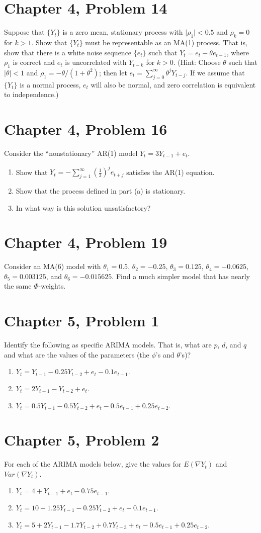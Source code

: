 \documentclass[11pt]{article}
\newif\ifclearpage
\newcommand{\problem}[1]{\section*{#1}}
\newcommand{\solution}{\hrulefill}
\newcommand{\maybeclearpage}{\ifclearpage\clearpage\fi}
\begin{document}
\problem{Chapter 4, Problem 14}
Suppose that $\{Y_t\}$ is a zero mean, stationary process with $\mid \rho_1 \mid < 0.5$ and $\rho_k = 0$ for $k > 1$. Show that $\{Y_t\}$ must be representable as an MA(1) process. That is, show that there is a white noise sequence $\{e_t\}$ such that $Y_t = e_t - \theta e_{t-1}$, where $\rho_1$ is correct and $e_t$ is uncorrelated with $Y_{t-k}$ for $k > 0$. (Hint: Choose $\theta$ such that $\mid \theta \mid < 1$ and $\rho_1 = -\theta/(1+\theta^2)$; then let $e_t = \sum_{j=0}^{\infty} \theta^jY_{t-j}$. If we assume that $\{Y_t\}$ is a normal process, $e_t$ will also be normal, and zero correlation is equivalent to independence.)

\solution


\maybeclearpage
\problem{Chapter 4, Problem 16}
Consider the ``nonstationary'' AR(1) model $Y_t = 3Y_{t-1} + e_t$.
\begin{enumerate}
	\item Show that $Y_t = - \sum_{j=1}^{\infty} \left( \frac{1}{3} \right)^j e_{t+j}$ satisfies the AR(1) equation.
	\item Show that the process defined in part (a) is stationary.
	\item In what way is this solution unsatisfactory?
\end{enumerate}

\solution


\maybeclearpage
\problem{Chapter 4, Problem 19}
Consider an MA(6) model with $\theta_1 = 0.5$, $\theta_2 = -0.25$, $\theta_3 = 0.125$, $\theta_4 = -0.0625$, $\theta_5 = 0.003125$, and $\theta_6 = -0.015625$. Find a much simpler model that has nearly the same $\Phi$-weights.

\solution

\maybeclearpage
\problem{Chapter 5, Problem 1}
Identify the following as specific ARIMA models. That is, what are $p$, $d$, and $q$ and what are the values of the parameters (the $\phi$'s and $\theta$'s)?
\begin{enumerate}
	\item $Y_t = Y_{t-1} - 0.25Y_{t-2} + e_t - 0.1e_{t-1}$.
	\item $Y_t = 2Y_{t-1} - Y_{t-2} + e_t$.
	\item $Y_t = 0.5Y_{t-1} - 0.5Y_{t-2} + e_t - 0.5e_{t-1} + 0.25e_{t-2}$.
\end{enumerate}

\solution


\maybeclearpage
\problem{Chapter 5, Problem 2}
For each of the ARIMA models below, give the values for $E(\nabla Y_t)$ and $Var(\nabla Y_t)$.
\begin{enumerate}
	\item $Y_t = 4 + Y_{t-1} + e_t - 0.75e_{t-1}$.
	\item $Y_t = 10 + 1.25Y_{t-1} - 0.25Y_{t-2} + e_t - 0.1e_{t-1}$.
	\item $Y_t = 5 + 2Y_{t-1} - 1.7Y_{t-2} + 0.7Y_{t-3} + e_t - 0.5e_{t-1} + 0.25e_{t-2}$.
\end{enumerate}
\end{document}
